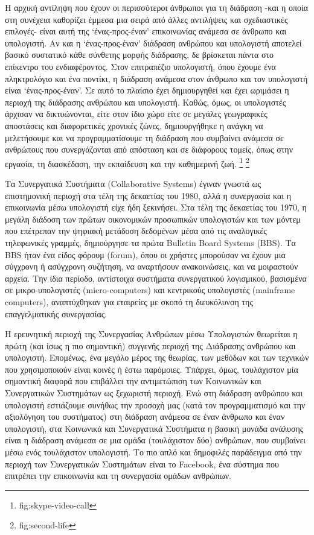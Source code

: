 \documentclass[
]{article}
\begin{document}
Η αρχική αντίληψη που έχουν οι περισσότεροι άνθρωποι για τη διάδραση
-και η οποία στη συνέχεια καθορίζει έμμεσα μια σειρά από άλλες
αντιλήψεις και σχεδιαστικές επιλογές- είναι αυτή της `ένας-προς-έναν'
επικοινωνίας ανάμεσα σε άνθρωπο και υπολογιστή. Αν και η
`ένας-προς-έναν' διάδραση ανθρώπου και υπολογιστή αποτελεί βασικό
συστατικό κάθε σύνθετης μορφής διάδρασης, δε βρίσκεται πάντα στο
επίκεντρο του ενδιαφέροντος. Στον επιτραπέζιο υπολογιστή, όπου έχουμε
ένα πληκτρολόγιο και ένα ποντίκι, η διάδραση ανάμεσα στον άνθρωπο και
τον υπολογιστή είναι `ένας-προς-έναν'. Σε αυτό το πλαίσιο έχει
δημιουργηθεί και έχει ωριμάσει η περιοχή της διάδρασης ανθρώπου και
υπολογιστή. Καθώς, όμως, οι υπολογιστές άρχισαν να δικτυώνονται, είτε
στον ίδιο χώρο είτε σε μεγάλες γεωγραφικές αποστάσεις και διαφορετικές
χρονικές ζώνες, δημιουργήθηκε η ανάγκη να μελετήσουμε και να
προγραμματίσουμε τη διάδραση που συμβαίνει ανάμεσα σε ανθρώπους που
συνεργάζονται από απόσταση και σε διάφορους τομείς, όπως στην εργασία,
τη διασκέδαση, την εκπαίδευση και την καθημερινή ζωή. \footnote{fig:skype-video-call}
\footnote{fig:second-life}

Τα Συνεργατικά Συστήματα (Collaborative Systems) έγιναν γνωστά ως
επιστημονική περιοχή στα τέλη της δεκαετίας του 1980, αλλά η συνεργασία
και η επικοινωνία μέσω υπολογιστή είχε ήδη ξεκινήσει. Στα τέλη της
δεκαετίας του 1970, η μεγάλη διάδοση των πρώτων οικονομικών προσωπικών
υπολογιστών και των μόντεμ που επέτρεπαν την ψηφιακή μετάδοση δεδομένων
μέσα από τις αναλογικές τηλεφωνικές γραμμές, δημιούργησε τα πρώτα
Bulletin Board Systems (BBS). Τα BBS ήταν ένα είδος φόρουμ (forum), όπου
οι χρήστες μπορούσαν να έχουν μια σύγχρονη ή ασύγχρονη συζήτηση, να
αναρτήσουν ανακοινώσεις, και να μοιραστούν αρχεία. Την ίδια περίοδο,
αντίστοιχα συστήματα συνεργατικού λογισμικού, βασισμένα σε
μικρο-υπολογιστές (micro-computers) και κεντρικούς υπολογιστές
(mainframe computers), αναπτύχθηκαν για εταιρείες με σκοπό τη
διευκόλυνση της επαγγελματικής συνεργασίας.

Η ερευνητική περιοχή της Συνεργασίας Ανθρώπων μέσω Υπολογιστών θεωρείται
η πρώτη (και ίσως η πιο σημαντική) συγγενής περιοχή της Διάδρασης
ανθρώπου και υπολογιστή. Επομένως, ένα μεγάλο μέρος της θεωρίας, των
μεθόδων και των τεχνικών που χρησιμοποιούν είναι κοινές ή έστω
παρόμοιες. Υπάρχει, όμως, τουλάχιστον μία σημαντική διαφορά που
επιβάλλει την αντιμετώπιση των Κοινωνικών και Συνεργατικών Συστημάτων ως
ξεχωριστή περιοχή. Ενώ στη διάδραση ανθρώπου και υπολογιστή εστιάζουμε
συνήθως την προσοχή μας (κατά τον προγραμματισμό και την αξιολόγηση του
συστήματος) στη διάδραση ανάμεσα σε έναν άνθρωπο και έναν υπολογιστή,
στα Κοινωνικά και Συνεργατικά Συστήματα η βασική μονάδα ανάλυσης είναι η
διάδραση ανάμεσα σε μια ομάδα (τουλάχιστον δύο) ανθρώπων, που συμβαίνει
μέσω ενός τουλάχιστον υπολογιστή. Το πιο απλό και δημοφιλές παράδειγμα
από την περιοχή των Συνεργατικών Συστημάτων είναι το Facebook, ένα
σύστημα που επιτρέπει την επικοινωνία και τη συνεργασία ομάδων ανθρώπων.
\end{document}
